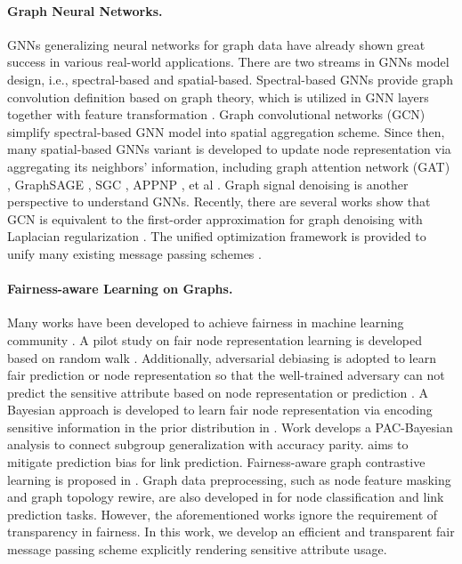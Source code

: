 \documentclass[letterpaper]{article} %
\theoremstyle{plain}
\theoremstyle{definition}
\theoremstyle{remark}
\begin{document}
\paragraph{Graph Neural Networks.} GNNs generalizing neural networks for graph data have already shown great success in various real-world applications. There are two streams in GNNs model design, i.e., spectral-based and spatial-based. Spectral-based GNNs provide graph convolution definition based on graph theory, which is utilized in GNN layers together with feature transformation \citep{bruna2013spectral,defferrard2016convolutional,henaff2015deep}. Graph convolutional networks (GCN) \citep{kipf2017semi} simplify spectral-based GNN model into spatial aggregation scheme. Since then, many spatial-based GNNs variant is developed to update node representation via aggregating its neighbors' information, including graph attention network (GAT) \citep{velivckovic2018graph},  GraphSAGE \citep{hamilton2017inductive}, SGC \citep{wu2019simplifying}, APPNP \citep{klicpera2019predict}, et al \citep{gao2018large,monti2017geometric}. Graph signal denoising is another perspective to understand GNNs. Recently, there are several works show that GCN is equivalent to the first-order approximation for graph denoising with Laplacian regularization \citep{henaff2015deep,zhao2019pairnorm}. The unified optimization framework is provided to unify many existing message passing schemes \citep{ma2021unified,zhu2021interpreting}.

\paragraph{Fairness-aware Learning on Graphs.} Many works have been developed to achieve fairness in machine learning community \citep{jiang2022generalized,han2023retiring,jiang2023weight, chuang2020fair,zhang2018mitigating,du2021fairness,yurochkin2020sensei,creager2019flexibly,feldman2015certifying}. A pilot study on fair node representation learning is developed based on random walk \citep{rahman2019fairwalk}. Additionally, adversarial debiasing is adopted to learn fair prediction or node representation so that the well-trained adversary can not predict the sensitive attribute based on node representation or prediction \citep{dai2021say,bose2019compositional,fisher2020debiasing}. A Bayesian approach is developed to learn fair node representation via encoding sensitive information in the prior distribution in \citep{buyl2020debayes}. Work \citep{ma2021subgroup} develops a PAC-Bayesian analysis to connect subgroup generalization with accuracy parity. \citep{laclau2021all,li2021dyadic} aims to mitigate prediction bias for link prediction. Fairness-aware graph contrastive learning is proposed in \citep{agarwal2021towards,kose2021fairness,ling2023learning}. Graph data preprocessing, such as node feature masking and graph topology rewire, are also developed in \citep{laclau2021all,li2021dyadic,dong2021individual,wang2022improving,zha2023data} for node classification and link prediction tasks. However, the aforementioned works ignore the requirement of transparency in fairness. In this work, we develop an efficient and transparent fair message passing scheme explicitly rendering sensitive attribute usage.
\end{document}
